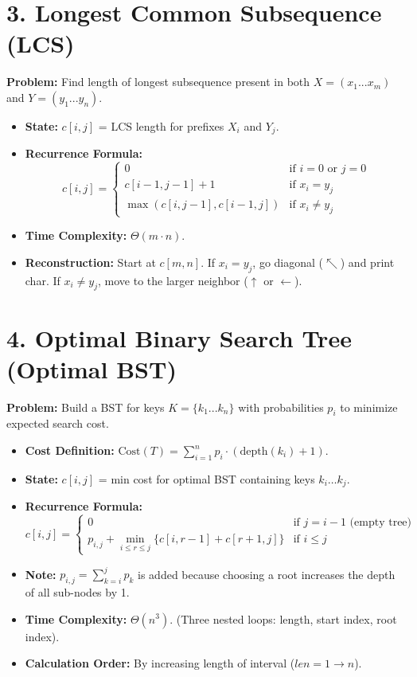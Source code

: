 \documentclass[10pt, a4paper]{article}
\begin{document}
\section*{3. Longest Common Subsequence (LCS)}
\textbf{Problem:} Find length of longest subsequence present in both $X=(x_1...x_m)$ and $Y=(y_1...y_n)$.
\begin{itemize}
    \item \textbf{State:} $c[i, j]$ = LCS length for prefixes $X_i$ and $Y_j$.
    \item \textbf{Recurrence Formula:}
    \[
    c[i,j] = 
    \begin{cases} 
    0 & \text{if } i=0 \text{ or } j=0 \\
    c[i-1, j-1] + 1 & \text{if } x_i = y_j \\
    \max(c[i, j-1], c[i-1, j]) & \text{if } x_i \neq y_j 
    \end{cases}
    \]
    \item \textbf{Time Complexity:} $\Theta(m \cdot n)$.
    \item \textbf{Reconstruction:} Start at $c[m,n]$. If $x_i = y_j$, go diagonal ($\nwarrow$) and print char. If $x_i \neq y_j$, move to the larger neighbor ($\uparrow$ or $\leftarrow$).
\end{itemize}

\hrulefill

\section*{4. Optimal Binary Search Tree (Optimal BST)}
\textbf{Problem:} Build a BST for keys $K=\{k_1...k_n\}$ with probabilities $p_i$ to minimize expected search cost.
\begin{itemize}
    \item \textbf{Cost Definition:} $\text{Cost}(T) = \sum_{i=1}^{n} p_i \cdot (\text{depth}(k_i) + 1)$.
    \item \textbf{State:} $c[i, j]$ = min cost for optimal BST containing keys $k_i \dots k_j$.
    \item \textbf{Recurrence Formula:}
    \[
    c[i,j] = 
    \begin{cases} 
    0 & \text{if } j = i-1 \text{ (empty tree)} \\
    p_{i,j} + \min_{i \le r \le j} \{ c[i, r-1] + c[r+1, j] \} & \text{if } i \le j 
    \end{cases}
    \]
    \item \textbf{Note:} $p_{i,j} = \sum_{k=i}^j p_k$ is added because choosing a root increases the depth of all sub-nodes by 1.
    \item \textbf{Time Complexity:} $\Theta(n^3)$. (Three nested loops: length, start index, root index).
    \item \textbf{Calculation Order:} By increasing length of interval ($len=1 \to n$).
\end{itemize}
\end{document}
